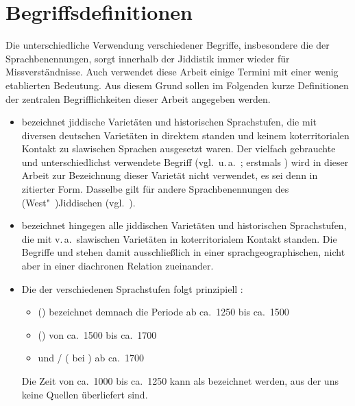 \section{Begriffsdefinitionen}\label{begriffsdefinitionen}
 \largerpage
Die unterschiedliche Verwendung verschiedener Begriffe, insbesondere die der Sprachbenennungen, sorgt innerhalb der Jiddistik immer wieder für Missverständnisse. Auch verwendet diese Arbeit einige Termini mit einer wenig etablierten Bedeutung. Aus diesem Grund sollen im Folgenden kurze Definitionen der zentralen Begrifflichkeiten dieser Arbeit angegeben werden. 

\begin{itemize}
\item {} bezeichnet jiddische Varietäten und historischen Sprachstufen, die mit diversen deutschen Varietäten in direktem  standen und keinem koterritorialen Kontakt zu slawischen Sprachen ausgesetzt waren. 
Der vielfach gebrauchte und unterschiedlichst verwendete Begriff  (vgl.\, u.\,a.\, \citealt{Simon1988,Weinberg1973,Weinberg1981,Lowenstein1979}; erstmals  \citealt{Wagenseil1699}) wird in dieser Arbeit zur Bezeichnung dieser Varietät nicht verwendet, es sei denn in zitierter Form. Dasselbe gilt für andere Sprachbenennungen des (West"~)Jiddischen (vgl.\, \citealt[3–9]{Weinreich1923}).
\item {} bezeichnet hingegen alle jiddischen Varietäten und historischen \mbox{Sprachstufen}, die mit v.\,a.\, slawischen  Varietäten in koterritorialem Kontakt standen. Die Begriffe  und  stehen damit ausschließlich in einer sprachgeographischen, nicht aber in einer diachronen Relation zueinander.
\item Die  der verschiedenen Sprachstufen folgt prinzipiell \cite[719--733]{Weinreich1973}: 





\begin{itemize}
\item  {} ({\aj}) bezeichnet demnach die Periode ab ca.\, 1250 bis ca.\, 1500
\item  {} ({\mj}) von ca.\, 1500 bis ca.\, 1700
\item  {} und / ( bei \citealt[719--733]{Weinreich1973}) ab ca.\, 1700
\end{itemize}
Die Zeit von ca.\, 1000 bis ca.\, 1250 kann als   bezeichnet werden, aus der uns keine Quellen überliefert sind. 


\end{itemize}
